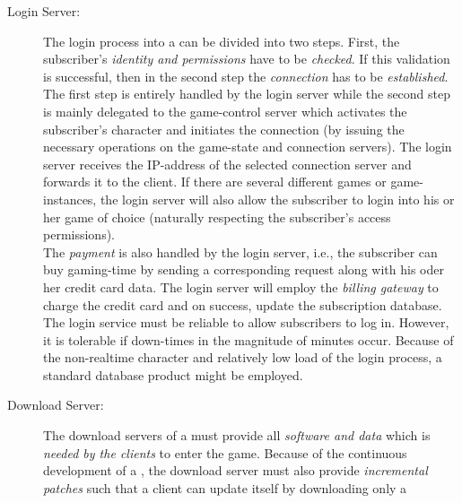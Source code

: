 \documentclass[a4paper, 10pt]{book}
\begin{document}
            \begin{description}
                \item[Login Server:] The login process into a \MMORG can be divided
                    into two steps. First, the subscriber's \emph{identity and
                    permissions} have to be \emph{checked}. If this validation is
                    successful, then in the second step the \emph{connection} has to be
                    \emph{established}. The first step is entirely handled by the login
                    server while the second step is mainly delegated to the game-control
                    server which activates the subscriber's character and initiates the
                    connection (by issuing the necessary operations on the game-state
                    and connection servers). The login server receives the IP-address of
                    the selected connection server and forwards it to the client.
                    If there are several different games or game-instances, the login
                    server will also allow the subscriber to login into his or her game
                    of choice (naturally respecting the subscriber's access
                    permissions).\\
                    The \emph{payment} is also handled by the login server, i.e., the
                    subscriber can buy gaming-time by sending a corresponding request
                    along with his oder her credit card data. The login server will
                    employ the \emph{billing gateway} to charge the credit card and on
                    success, update the subscription database.
                    The login service must be reliable to allow subscribers to log
                    in. However, it is tolerable if down-times in the magnitude of
                    minutes occur. Because of the non-realtime character and
                    relatively low load of the login process, a standard database product
                    might be employed.
                    \item[Download Server:] The download servers of a \MMORG must provide
                        all \emph{software and data} which is \emph{needed by the clients}
                        to enter the game. Because of the continuous development of a
                        \MMORG, the download server must also provide \emph{incremental
                        patches} such that a client can update itself by downloading only a

\end{description}
\end{document}
